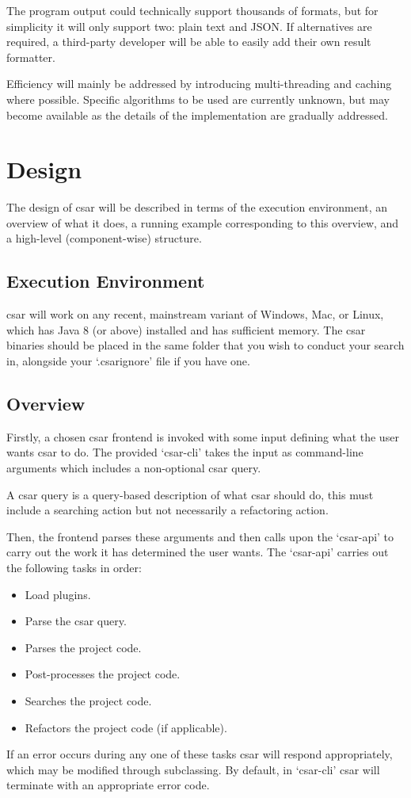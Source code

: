 \documentclass[12pt, letterpaper]{article}
\begin{document}
The program output could technically support thousands of formats, but for simplicity it will only support two: plain text and JSON.
If alternatives are required, a third-party developer will be able to easily add their own result formatter.

Efficiency will mainly be addressed by introducing multi-threading and caching where possible.
Specific algorithms to be used are currently unknown, but may become available as the details of the implementation are gradually addressed.

\section{Design}

The design of csar will be described in terms of the execution environment, an overview of what it does, a running example corresponding to this overview, and a high-level (component-wise) structure.

\subsection{Execution Environment}
csar will work on any recent, mainstream variant of Windows, Mac, or Linux, which has Java 8 (or above) installed and has sufficient memory.
The csar binaries should be placed in the same folder that you wish to conduct your search in, alongside your `.csarignore' file if you have one.

\subsection{Overview}
Firstly, a chosen csar frontend is invoked with some input defining what the user wants csar to do.
The provided `csar-cli' takes the input as command-line arguments which includes a non-optional csar query.

A csar query is a query-based description of what csar should do, this must include a searching action but not necessarily a refactoring action.

Then, the frontend parses these arguments and then calls upon the `csar-api' to carry out the work it has determined the user wants.
The `csar-api' carries out the following tasks in order:
\begin{itemize}
  \item Load plugins.
  \item Parse the csar query.
  \item Parses the project code.
  \item Post-processes the project code.
  \item Searches the project code.
  \item Refactors the project code (if applicable).
\end{itemize}
If an error occurs during any one of these tasks csar will respond appropriately, which may be modified through subclassing.
By default, in `csar-cli' csar will terminate with an appropriate error code.
\end{document}
